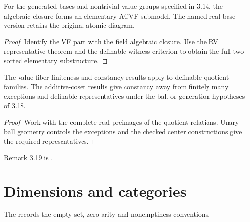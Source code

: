 \begin{corollary}
\label{cor:acl-model}
\leanok
For the generated bases and nontrivial value groups specified in 3.14,
the algebraic closure forms an elementary ACVF submodel. The named
real-base version retains the original atomic diagram.
\end{corollary}
\begin{proof}
\leanok
{}
Identify the VF part with the field algebraic closure. Use the RV
representative theorem and the definable witness criterion to obtain
the full two-sorted elementary substructure.
\end{proof}

\begin{lemma}
\label{lem:quotient-families}
\leanok
The value-fiber finiteness and constancy results apply to definable
quotient families. The additive-coset results give constancy away
from finitely many exceptions and definable representatives under
the ball or generation hypotheses of 3.18.
\end{lemma}
\begin{proof}
\leanok
{}
Work with the complete real preimages of the quotient relations.
Unary ball geometry controls the exceptions and the checked
center constructions give the required representatives.
\end{proof}

Remark 3.19 is .

\section{Dimensions and categories}

The  records the empty-set,
zero-arity and nonemptiness conventions.

